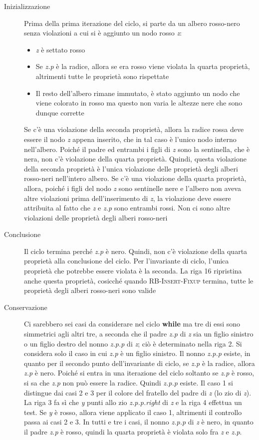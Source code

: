 \documentclass[10pt, a4paper]{report}
\begin{document}
\begin{description}
\item[Inizializzazione]Prima della prima iterazione del ciclo, si parte da un albero rosso-nero senza violazioni a cui si è aggiunto un nodo rosso \textit{z}:
\begin{itemize}
\item\textit{z} è settato rosso
\item Se \textit{z.p} è la radice, allora se era rosso viene violata la quarta proprietà, altrimenti tutte le proprietà sono rispettate
\item Il resto dell'albero rimane immutato, è stato aggiunto un nodo che viene colorato in rosso ma questo non varia le altezze nere che sono dunque corrette
\end{itemize}
Se c'è una violazione della seconda proprietà, allora la radice rossa deve essere il nodo \textit{z} appena inserito, che in tal caso è l'unico nodo interno nell'albero. Poiché il padre ed entrambi i figli di \textit{z} sono la sentinella, che è nera, non c'è violazione della quarta proprietà. Quindi, questa violazione della seconda proprietà è l'unica violazione delle proprietà degli alberi rosso-neri nell'intero albero. Se c'è una violazione della quarta proprietà, allora, poiché i figli del nodo \textit{z} sono sentinelle nere e l'albero non aveva altre violazioni prima dell'inserimento di \textit{z}, la violazione deve essere attribuita al fatto che \textit{z} e \textit{z.p} sono entrambi rossi. Non ci sono altre violazioni delle proprietà degli alberi rosso-neri
\item[Conclusione]Il ciclo termina perché \textit{z.p} è nero. Quindi, non c'è violazione della quarta proprietà alla conclusione del ciclo. Per l'invariante di ciclo, l'unica proprietà che potrebbe essere violata è la seconda. La riga 16 ripristina anche questa proprietà, cosicché quando \textsc{RB-Insert-Fixup} termina, tutte le proprietà degli alberi rosso-neri sono valide
\item[Conservazione]Ci sarebbero sei casi da considerare nel ciclo \textbf{while} ma tre di essi sono simmetrici agli altri tre, a seconda che il padre \textit{z.p} di \textit{z} sia un figlio sinistro o un figlio destro del nonno \textit{z.p.p} di \textit{z}; ciò è determinato nella riga 2. Si considera solo il caso in cui \textit{z.p} è un figlio sinistro. Il nonno \textit{z.p.p} esiste, in quanto per il secondo punto dell'invariante di ciclo, se \textit{z.p} è la radice, allora \textit{z.p} è nero. Poiché si entra in una iterazione del ciclo soltanto se \textit{z.p} è rosso, si sa che \textit{z.p} non può essere la radice. Quindi \textit{z.p.p} esiste.  Il caso 1 si distingue dai casi 2 e 3 per il colore del fratello del padre di \textit{z} (lo zio di \textit{z}). La riga 3 fa sì che \textit{y} punti allo zio \textit{z.p.p.right} di \textit{z} e la riga 4 effettua un test. Se \textit{y} è rosso, allora viene applicato il caso 1, altrimenti il controllo passa ai casi 2 e 3. In tutti e tre i casi, il nonno \textit{z.p.p} di \textit{z} è nero, in quanto il padre \textit{z.p} è rosso, quindi la quarta proprietà è violata solo fra \textit{z} e \textit{z.p}.

\end{description}
\end{document}
